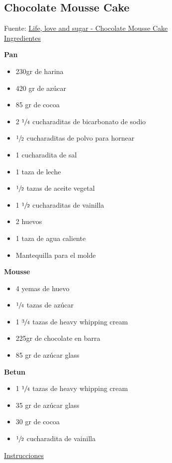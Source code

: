 \subsection{Chocolate Mousse Cake}

Fuente: \href{https://www.lifeloveandsugar.com/2017/10/23/chocolate-mousse-cake/}{Life, love and sugar - Chocolate Mousse Cake}\\

\underline{Ingredientes}

\textbf{Pan}
\begin{itemize}
\item 230gr de harina
\item 420 gr de azúcar
\item 85 gr de cocoa
\item 2 $\sfrac{1}{4}$ cucharaditas de bicarbonato de sodio
\item $\sfrac{1}{2}$ cucharaditas de polvo para hornear
\item 1 cucharadita de sal
\item 1 taza de leche
\item $\sfrac{1}{2}$ tazas de aceite vegetal
\item 1 $\sfrac{1}{2}$ cucharaditas de vainilla
\item 2 huevos
\item 1 taza de agua caliente
\item Mantequilla para el molde
\end{itemize}

\textbf{Mousse}
\begin{itemize}
\item 4 yemas de huevo
\item $\sfrac{1}{4}$ tazas de azúcar
\item 1 $\sfrac{3}{4}$ tazas de heavy whipping cream
\item 225gr de chocolate en barra
\item 85 gr de azúcar glass 
\end{itemize}

\textbf{Betun}
\begin{itemize}
\item 1 $\sfrac{1}{4}$ tazas de heavy whipping cream
\item 35 gr de azúcar glass
\item 30 gr de cocoa
\item $\sfrac{1}{2}$ cucharadita de vainilla
\end{itemize}

\underline{Instrucciones}

